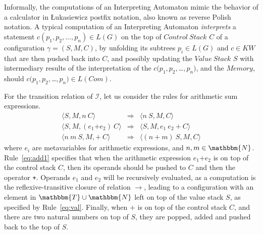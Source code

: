 \documentclass[a4paper,openany]{book}
\begin{document}
Informally, the computations of an Interpreting Automaton mimic the behavior of a calculator
in Łukasiewicz postfix notation, also known as reverse Polish notation. A typical computation of an Interpreting Automaton
\emph{interprets} a statement $c(p_1, p_2, \ldots, p_n) \in L(G)$ on the top of $\mathit{Control~Stack}$ \(C\) of a
configuration \(\gamma = (S, M, C)\), by unfolding its subtrees $p_i \in L(G)$ and $c \in \mathit{KW}$ that are then pushed back into $C$, and possibly updating the $\mathit{Value~Stack}$
\(S\) with intermediary results of the interpretation of the $c(p_1, p_2, $\ldots$, p_n)$, and the $\mathit{Memory}$, should $c(p_1, p_2, $\ldots$, p_n) \in L(\mathit{Com})$.

For the transition relation of $\mathcal{I}$, let us consider the rules for
arithmetic sum expressions. %
\begin{eqnarray}
\label{eq:val}\langle S, M, n~ C \rangle & \Rightarrow & \langle n ~ S, M, C \rangle \\
\label{eq:add1}\langle S, M, (e_1 \mathtt{+} e_2) ~ C \rangle & \Rightarrow &
\label{eq:add2} \langle S, M, e_1 ~ e_2 ~ \mathtt{+}~ C \rangle \\
\langle n ~ m ~ S, M, \mathtt{+}~ C \rangle & \Rightarrow & \langle (n + m)~ S, M, C \rangle
\end{eqnarray}
where \(e_i\) are metavariables for arithmetic expressions, and \(n, m
\in \mathbbm{N}\).  Rule~\ref{eq:add1} specifies that when the
arithmetic expression \(e_1 \mathtt{+} e_2\) is on top of the control
stack \(C\), then its operands should be pushed to \(C\) and then the
operator \texttt{+}. Operands \(e_1\) and \(e_2\) will be recursively
evaluated, as a computation is the reflexive-transitive closure of
relation \(\rightarrow\), leading to a configuration with an element in $\mathbbm{T} \cup \mathbbm{N}$ left on
top of the value stack $S$, as specified by
Rule~\ref{eq:val}. Finally, when $\mathtt{+}$ is on top of the control
stack $C$, and there are two natural numbers on top of $S$, they are
popped, added and pushed back to the top of $S$.
\end{document}

